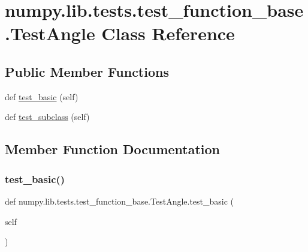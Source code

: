 \hypertarget{classnumpy_1_1lib_1_1tests_1_1test__function__base_1_1TestAngle}{}\section{numpy.\+lib.\+tests.\+test\+\_\+function\+\_\+base.\+Test\+Angle Class Reference}
\label{classnumpy_1_1lib_1_1tests_1_1test__function__base_1_1TestAngle}
\subsection*{Public Member Functions}
\begin{DoxyCompactItemize}
\item 
def \hyperlink{classnumpy_1_1lib_1_1tests_1_1test__function__base_1_1TestAngle_aa260c43a9e11a1e9f903253af3a263c4}{test\+\_\+basic} (self)
\item 
def \hyperlink{classnumpy_1_1lib_1_1tests_1_1test__function__base_1_1TestAngle_ae0cab217b2149dc5d978cd92d0a02e26}{test\+\_\+subclass} (self)
\end{DoxyCompactItemize}


\subsection{Member Function Documentation}
\mbox{\label{classnumpy_1_1lib_1_1tests_1_1test__function__base_1_1TestAngle_aa260c43a9e11a1e9f903253af3a263c4}} 
\subsubsection{\texorpdfstring{test\+\_\+basic()}{test\_basic()}}
{\footnotesize\ttfamily def numpy.\+lib.\+tests.\+test\+\_\+function\+\_\+base.\+Test\+Angle.\+test\+\_\+basic (\begin{DoxyParamCaption}\item[{}]{self }\end{DoxyParamCaption})}

